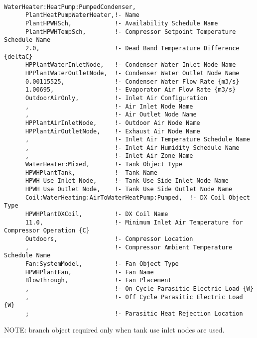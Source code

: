 \begin{lstlisting}

WaterHeater:HeatPump:PumpedCondenser,
      PlantHeatPumpWaterHeater,!- Name
      PlantHPWHSch,            !- Availability Schedule Name
      PlantHPWHTempSch,        !- Compressor Setpoint Temperature Schedule Name
      2.0,                     !- Dead Band Temperature Difference {deltaC}
      HPPlantWaterInletNode,   !- Condenser Water Inlet Node Name
      HPPlantWaterOutletNode,  !- Condenser Water Outlet Node Name
      0.00115525,              !- Condenser Water Flow Rate {m3/s}
      1.00695,                 !- Evaporator Air Flow Rate {m3/s}
      OutdoorAirOnly,          !- Inlet Air Configuration
      ,                        !- Air Inlet Node Name
      ,                        !- Air Outlet Node Name
      HPPlantAirInletNode,     !- Outdoor Air Node Name
      HPPlantAirOutletNode,    !- Exhaust Air Node Name
      ,                        !- Inlet Air Temperature Schedule Name
      ,                        !- Inlet Air Humidity Schedule Name
      ,                        !- Inlet Air Zone Name
      WaterHeater:Mixed,       !- Tank Object Type
      HPWHPlantTank,           !- Tank Name
      HPWH Use Inlet Node,     !- Tank Use Side Inlet Node Name
      HPWH Use Outlet Node,    !- Tank Use Side Outlet Node Name
      Coil:WaterHeating:AirToWaterHeatPump:Pumped,  !- DX Coil Object Type
      HPWHPlantDXCoil,         !- DX Coil Name
      11.0,                    !- Minimum Inlet Air Temperature for Compressor Operation {C}
      Outdoors,                !- Compressor Location
      ,                        !- Compressor Ambient Temperature Schedule Name
      Fan:SystemModel,         !- Fan Object Type
      HPWHPlantFan,            !- Fan Name
      BlowThrough,             !- Fan Placement
      ,                        !- On Cycle Parasitic Electric Load {W}
      ,                        !- Off Cycle Parasitic Electric Load {W}
      ;                        !- Parasitic Heat Rejection Location
\end{lstlisting}

NOTE: branch object required only when tank use inlet nodes are used.

